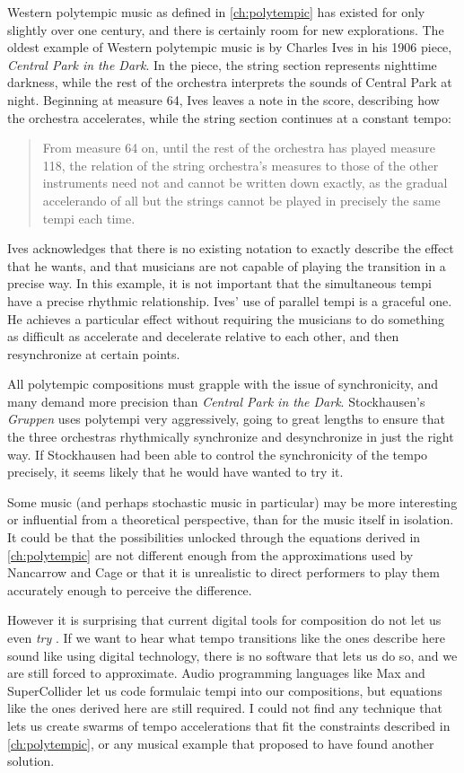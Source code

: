 Western polytempic music as defined in \autoref{ch:polytempic} has
existed for only slightly over one century, and there is certainly
room for new explorations. The oldest example of Western polytempic
music is by Charles Ives in his 1906 piece, \textit{Central Park in
  the Dark}.\cite{Greschak2003} In the piece, the string section
represents nighttime darkness, while the rest of the orchestra
interprets the sounds of Central Park at night. Beginning at measure
64, Ives leaves a note in the score, describing how the orchestra
accelerates, while the string section continues at a constant tempo:
\begin{quotation}
  From measure 64 on, until the rest of the orchestra has played
  measure 118, the relation of the string orchestra's measures to
  those of the other instruments need not and cannot be written down
  exactly, as the gradual accelerando of all but the strings cannot be
  played in precisely the same tempi each time.
\end{quotation}
Ives acknowledges that there is no existing notation to exactly
describe the effect that he wants, and that musicians are not capable
of playing the transition in a precise way. In this example, it is not
important that the simultaneous tempi have a precise rhythmic
relationship. Ives' use of parallel tempi is a graceful one. He
achieves a particular effect without requiring the musicians to do
something as difficult as accelerate and decelerate relative to each
other, and then resynchronize at certain points.

All polytempic compositions must grapple with the issue of
synchronicity, and many demand more precision than \textit{Central
  Park in the Dark}. Stockhausen's \textit{Gruppen} uses polytempi
very aggressively, going to great lengths to ensure that the three
orchestras rhythmically synchronize and desynchronize in just the
right way. If Stockhausen had been able to control the synchronicity
of the tempo precisely, it seems likely that he would have wanted to
try it.

Some music (and perhaps stochastic music in particular) may be more
interesting or influential from a theoretical perspective, than for
the music itself in isolation. It could be that the possibilities
unlocked through the equations derived in \autoref{ch:polytempic} are
not different enough from the approximations used by Nancarrow and
Cage or that it is unrealistic to direct performers to play them
accurately enough to perceive the difference.

However it is surprising that current digital tools for composition do
not let us even \emph{try} \polytempic. If we want to hear what tempo
transitions like the ones describe here sound like using digital
technology, there is no software that lets us do so, and we are still
forced to approximate. Audio programming languages like Max and
SuperCollider let us code formulaic tempi into our compositions, but
equations like the ones derived here are still required. I could not
find any technique that lets us create swarms of tempo
accelerations that fit the constraints described in
\autoref{ch:polytempic}, or any musical example that proposed to have
found another solution.

